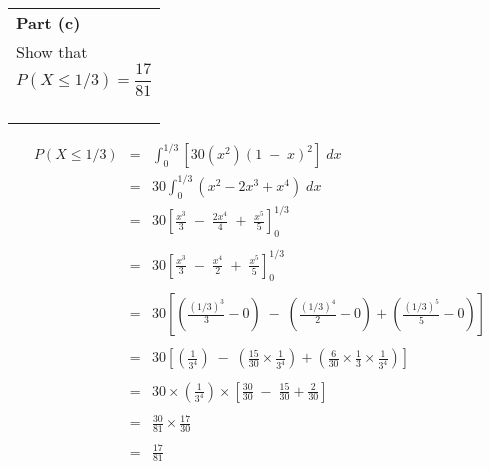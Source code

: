 \documentclass[a4paper,30pt]{article}
\begin{document}
\newpage
    \begin{table}[ht!]
     \centering
     \begin{tabular}{|p{15cm}|}
     \hline \large        
\noindent \textbf{Part (c)} \\ \large Show that \[  P(X \leq 1/3 ) = \frac{17}{81} \]

\\ \hline
      \end{tabular}
    \end{table}
{
\large
\begin{eqnarray*}
P(X \leq 1/3 ) &=& \int^{1/3}_{0} [30(x^2)(1\;-\;x)^2]\; dx \\
&=& 30 \int^{1/3}_{0} (x^2 -2x^3 + x^4)\; dx\\
&=& 30 \left[ \frac{x^3}{3}  \;-\;  \frac{2x^4}{4} \; + \; \frac{x^5}{5}  \right]^{1/3}_{0}\\
& & \\
&=& 30 \left[ \frac{x^3}{3}  \;-\;  \frac{x^4}{2} \; + \; \frac{x^5}{5}  \right]^{1/3}_{0}\\
& & \\
&=& 30 \left[ \left( \frac{(1/3)^3}{3}- 0 \right) \;-\; \left( \frac{(1/3)^4}{2}- 0 \right) +  \left( \frac{(1/3)^5}{5}- 0 \right) \right]\\
& & \\
&=& 30 \left[ \left( \frac{1}{3^4} \right) \;-\; \left( \frac{15}{30} \times \frac{1}{3^4} \right) +  \left( \frac{6}{30} \times \frac{1}{3}\times \frac{1}{3^4} \right) \right]\\
& & \\
&=& 30 \times \left( \frac{1}{3^4} \right) \times \left[ \frac{30}{30} \;-\;  \frac{15}{30}  + \frac{2}{30}  \right]\\
& & \\
&=&  \frac{30}{81} \times \frac{17}{30} \\
& & \\
&=&  \frac{17}{81}\\
\end{eqnarray*}
}


\newpage
\end{document}
